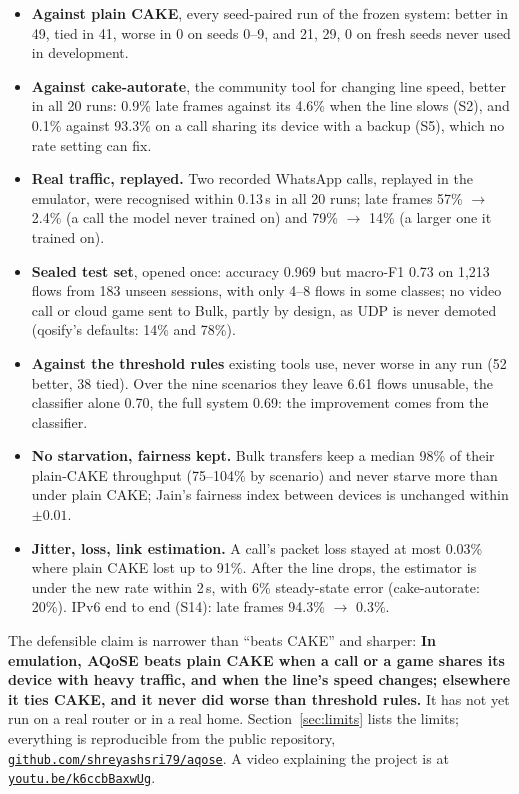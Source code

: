\documentclass[11pt,a4paper]{article}
\begin{document}
\begin{itemize}[itemsep=1pt,topsep=4pt]
\item \textbf{Against plain CAKE}, every seed-paired run of the frozen system: better in 49, tied in 41, worse in 0 on seeds 0--9, and 21, 29, 0 on fresh seeds never used in development.
\item \textbf{Against cake-autorate}, the community tool for changing line speed, better in all 20 runs: 0.9\% late frames against its 4.6\% when the line slows (S2), and 0.1\% against 93.3\% on a call sharing its device with a backup (S5), which no rate setting can fix.
\item \textbf{Real traffic, replayed.} Two recorded WhatsApp calls, replayed in the emulator, were recognised within 0.13\,s in all 20 runs; late frames 57\% $\to$ 2.4\% (a call the model never trained on) and 79\% $\to$ 14\% (a larger one it trained on).
\item \textbf{Sealed test set}, opened once: accuracy 0.969 but macro-F1 0.73 on 1,213 flows from 183 unseen sessions, with only 4--8 flows in some classes; no video call or cloud game sent to Bulk, partly by design, as UDP is never demoted (qosify's defaults: 14\% and 78\%).
\item \textbf{Against the threshold rules} existing tools use, never worse in any run (52 better, 38 tied). Over the nine scenarios they leave 6.61 flows unusable, the classifier alone 0.70, the full system 0.69: the improvement comes from the classifier.
\item \textbf{No starvation, fairness kept.} Bulk transfers keep a median 98\% of their plain-CAKE throughput (75--104\% by scenario) and never starve more than under plain CAKE; Jain's fairness index between devices is unchanged within $\pm0.01$.
\item \textbf{Jitter, loss, link estimation.} A call's packet loss stayed at most 0.03\% where plain CAKE lost up to 91\%. After the line drops, the estimator is under the new rate within 2\,s, with 6\% steady-state error (cake-autorate: 20\%). IPv6 end to end (S14): late frames 94.3\% $\to$ 0.3\%.
\end{itemize}

The defensible claim is narrower than ``beats CAKE'' and sharper: \textbf{In emulation, AQoSE beats plain CAKE when a call or a game shares its device with heavy traffic, and when the line's speed changes; elsewhere it ties CAKE, and it never did worse than threshold rules.} It has not yet run on a real router or in a real home. Section~\ref{sec:limits} lists the limits; everything is reproducible from the public repository, \href{https://github.com/shreyashsri79/aqose}{\texttt{github.com/shreyashsri79/aqose}}. A video explaining the project is at \href{https://youtu.be/k6ccbBaxwUg}{\texttt{youtu.be/k6ccbBaxwUg}}.
\end{document}
